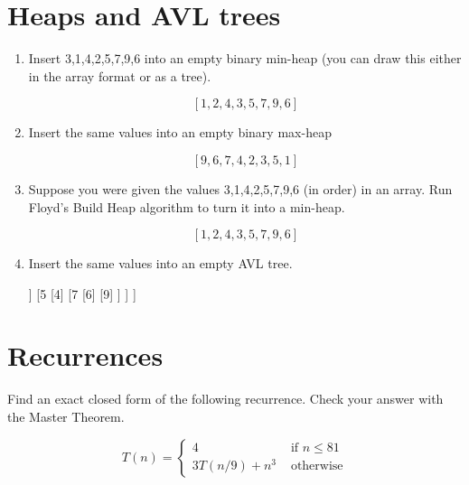 \documentclass[12pt]{article}
\begin{document}
\section{Heaps and AVL trees}
\begin{enumerate}

\item Insert 3,1,4,2,5,7,9,6 into an empty binary min-heap (you can draw this either in the array format or as a tree). 
\begin{tcolorbox}
\[[1, 2, 4, 3, 5, 7, 9, 6]\]
\end{tcolorbox}

\item Insert the same values into an empty binary max-heap
\begin{tcolorbox}
\[[9, 6, 7, 4, 2, 3, 5, 1]\]
\end{tcolorbox}

\item Suppose you were given the values 3,1,4,2,5,7,9,6 (in order) in an array. Run Floyd's Build Heap algorithm to turn it into a min-heap.
\begin{tcolorbox}
\[[1, 2, 4, 3, 5, 7, 9, 6]\]
\end{tcolorbox}

\newpage
\item Insert the same values into an empty AVL tree.\\
\begin{tcolorbox}
\begin{center}
\begin{forest}
[3
	[1
		[ ,no edge]
		[2]
	]
	[5
		[4]
		[7
			[6]
			[9]
		]
	]
]
\end{forest}
\end{center}
\end{tcolorbox}
\end{enumerate}

\section{Recurrences}
Find an exact closed form of the following recurrence. Check your answer with the Master Theorem.

\[ T(n) = \begin{cases} 4 &\text{ if } n \leq 81\\
						 3T(n/9) + n^3 &\text{ otherwise} \end{cases}\]
\end{document}
